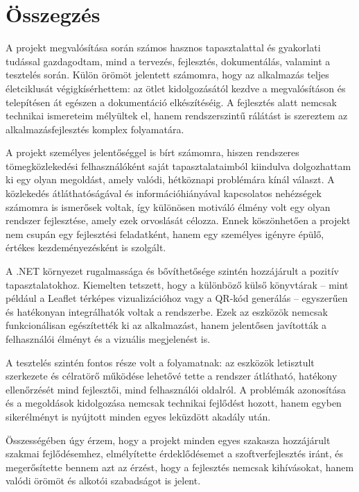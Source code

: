 \section*{Összegzés}


A projekt megvalósítása során számos hasznos tapasztalattal és gyakorlati tudással gazdagodtam, mind a tervezés, fejlesztés, dokumentálás, valamint a tesztelés során. Külön örömöt jelentett számomra, hogy az alkalmazás teljes életciklusát végigkísérhettem: az ötlet kidolgozásától kezdve a megvalósításon és telepítésen át egészen a dokumentáció elkészítéséig. A fejlesztés alatt nemcsak technikai ismereteim mélyültek el, hanem rendszerszintű rálátást is szereztem az alkalmazásfejlesztés komplex folyamatára.

A projekt személyes jelentőséggel is bírt számomra, hiszen rendszeres tömegközlekedési felhasználóként saját tapasztalataimból kiindulva dolgozhattam ki egy olyan megoldást, amely valódi, hétköznapi problémára kínál választ. A közlekedés átláthatóságával és információhiányával kapcsolatos nehézségek számomra is ismerősek voltak, így különösen motiváló élmény volt egy olyan rendszer fejlesztése, amely ezek orvoslását célozza. Ennek köszönhetően a projekt nem csupán egy fejlesztési feladatként, hanem egy személyes igényre épülő, értékes kezdeményezésként is szolgált.

A .NET környezet rugalmassága és bővíthetősége szintén hozzájárult a pozitív tapasztalatokhoz. Kiemelten tetszett, hogy a különböző külső könyvtárak – mint például a Leaflet térképes vizualizációhoz vagy a QR-kód generálás – egyszerűen és hatékonyan integrálhatók voltak a rendszerbe. Ezek az eszközök nemcsak funkcionálisan egészítették ki az alkalmazást, hanem jelentősen javították a felhasználói élményt és a vizuális megjelenést is.

A tesztelés szintén fontos része volt a folyamatnak: az eszközök letisztult szerkezete és célratörő működése lehetővé tette a rendszer átlátható, hatékony ellenőrzését mind fejlesztői, mind felhasználói oldalról. A problémák azonosítása és a megoldások kidolgozása nemcsak technikai fejlődést hozott, hanem egyben sikerélményt is nyújtott minden egyes leküzdött akadály után.

Összességében úgy érzem, hogy a projekt minden egyes szakasza hozzájárult szakmai fejlődésemhez, elmélyítette érdeklődésemet a szoftverfejlesztés iránt, és megerősítette bennem azt az érzést, hogy a fejlesztés nemcsak kihívásokat, hanem valódi örömöt és alkotói szabadságot is jelent.

